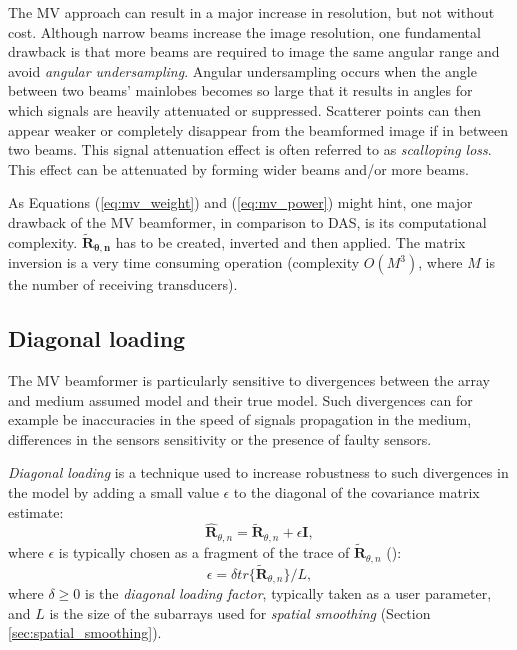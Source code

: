 The MV approach can result in a major increase in resolution, but not without cost.
Although narrow beams increase the image resolution, one fundamental drawback is that more beams are required to image the same angular range and avoid \textit{angular undersampling}. Angular undersampling occurs when the angle between two beams' mainlobes becomes so large that it results in angles for which signals are heavily attenuated or suppressed. Scatterer points can then appear weaker or completely disappear from the beamformed image if in between two beams. This signal attenuation effect is often referred to as \textit{scalloping loss}. This effect can be attenuated by forming wider beams and/or more beams.

As Equations (\ref{eq:mv_weight}) and (\ref{eq:mv_power}) might hint, one major drawback of the MV beamformer, in comparison to DAS, is its computational complexity.
$\boldsymbol{\tilde{R}_{\theta,n}}$ has to be created, inverted and then applied. The matrix inversion is a very time consuming operation (complexity $O(M^3)$, where $M$ is the number of receiving transducers).

\subsection{Diagonal loading}
\label{sec:diagonal_loading}
The MV beamformer is particularly sensitive to divergences between the array and medium assumed model and their true model. Such divergences can for example be inaccuracies in the speed of signals propagation in the medium, differences in the sensors sensitivity or the presence of faulty sensors.

\textit{Diagonal loading} is a technique used to increase robustness to such divergences in the model by adding a small value $\epsilon$ to the diagonal of the covariance matrix estimate:
\begin{equation}
    \boldsymbol{\hat{R}}_{\theta, n} = \boldsymbol{\tilde{R}}_{\theta, n} + \epsilon \boldsymbol{I},
\end{equation}
\noindent
where $\epsilon$ is typically chosen as a fragment of the trace of $\boldsymbol{\tilde{R}}_{\theta, n}$ (\cite{Synnevag_adaptive}):
\begin{equation}
    \epsilon = \delta tr\{\boldsymbol{\tilde{R}}_{\theta, n} \} / L,
\end{equation}
\noindent
where $\delta \geq 0$ is the \textit{diagonal loading factor}, typically taken as a user parameter, and $L$ is the size of the subarrays used for \textit{spatial smoothing} (Section \ref{sec:spatial_smoothing}).


